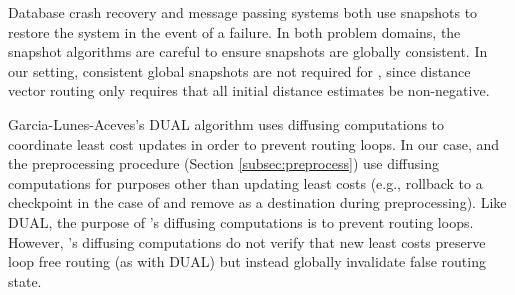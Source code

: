 
Database crash recovery \cite{Mohan92} and message passing systems \cite{Arini} both use snapshots to restore the system in the event of a failure. In both 
problem domains, the snapshot algorithms are careful to ensure snapshots are globally consistent. 
In our setting, consistent global snapshots are not required for \cprs, since  
distance vector routing only requires that all initial distance estimates be non-negative.

Garcia-Lunes-Aceves's DUAL algorithm \cite{JJ93} uses diffusing computations to coordinate least cost updates in order to prevent routing loops. 
In our case, \cpr and the preprocessing procedure (Section \ref{subsec:preprocess}) use diffusing computations for purposes other than updating least costs (e.g., rollback to a checkpoint in the case of \cpr
and remove \bad as a destination during preprocessing). Like DUAL, the purpose of \purges's diffusing computations is to prevent routing loops.  However, \purges's diffusing computations
do not verify that new least costs preserve loop free routing (as with DUAL) but instead globally invalidate false routing state. 






